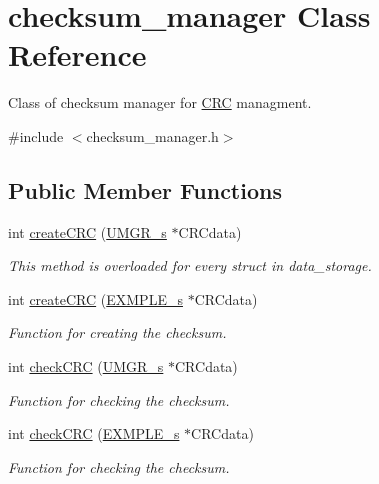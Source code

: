 \hypertarget{classchecksum__manager}{}\section{checksum\+\_\+manager Class Reference}
\label{classchecksum__manager}


Class of checksum manager for \hyperlink{structCRC}{C\+RC} managment.  




{\ttfamily \#include $<$checksum\+\_\+manager.\+h$>$}

\subsection*{Public Member Functions}
\begin{DoxyCompactItemize}
\item 
int \hyperlink{classchecksum__manager_a31afd631fa3668a1dfd08ee0b8807d16}{create\+C\+RC} (\hyperlink{structUMGR__s}{U\+M\+G\+R\+\_\+s} $\ast$C\+R\+Cdata)
\begin{DoxyCompactList}\small\item\em This method is overloaded for every struct in data\+\_\+storage. \end{DoxyCompactList}\item 
int \hyperlink{classchecksum__manager_a613cc124da07b2f7d002eefb2065a2e3}{create\+C\+RC} (\hyperlink{structEXMPLE__s}{E\+X\+M\+P\+L\+E\+\_\+s} $\ast$C\+R\+Cdata)
\begin{DoxyCompactList}\small\item\em Function for creating the checksum. \end{DoxyCompactList}\item 
int \hyperlink{classchecksum__manager_a14eeba6bf4d2ad333c227339bd453a72}{check\+C\+RC} (\hyperlink{structUMGR__s}{U\+M\+G\+R\+\_\+s} $\ast$C\+R\+Cdata)
\begin{DoxyCompactList}\small\item\em Function for checking the checksum. \end{DoxyCompactList}\item 
int \hyperlink{classchecksum__manager_a74f8d881aee7981cc60b2d169915bc4e}{check\+C\+RC} (\hyperlink{structEXMPLE__s}{E\+X\+M\+P\+L\+E\+\_\+s} $\ast$C\+R\+Cdata)
\begin{DoxyCompactList}\small\item\em Function for checking the checksum. \end{DoxyCompactList}\end{DoxyCompactItemize}


